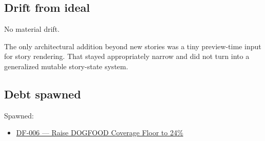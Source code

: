 \subsection{Drift from ideal}\label{record-067-drift-from-ideal}

No material drift.

The only architectural addition beyond new stories was a tiny preview-time input for story rendering. That stayed appropriately narrow and did not turn into a generalized mutable story-state system.

\subsection{Debt spawned}\label{record-067-debt-spawned}

Spawned:

\begin{itemize}
\tightlist
\item
  \href{https://github.com/flyingrobots/bijou/blob/cbd70612140e7a450d764b3c7be1c6af878b99bc/docs/design/DF-006-raise-dogfood-coverage-floor-to-24-percent.md}{DF-006 --- Raise DOGFOOD Coverage Floor to 24\%}
\end{itemize}

